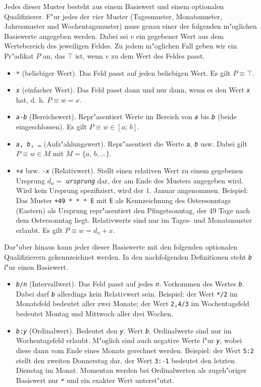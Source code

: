 \documentclass[a4paper]{article}
\numberwithin{equation}{section}
\begin{document}
Jedes dieser Muster besteht aus einem Basiswert und einem optionalen
Qualifizierer. F"ur jedes der vier Muster (Tagesmuster, Monatsmuster,
Jahresmuster und Wochentagsmuster) muss genau einer der folgenden m"oglichen
Basiswerte angegeben werden. Dabei sei $v$ ein gegebener Wert aus dem
Wertebereich des jeweiligen Feldes. Zu jedem m"oglichen Fall geben wir ein
Pr"adikat $P$ an, das $\top$ ist, wenn $v$ zu dem Wert des Feldes passt.
\begin{itemize}
\item \texttt{*} (beliebiger Wert). Das Feld passt auf jeden beliebigen Wert. Es
  gilt $P \equiv \top$.
\item \texttt{\textit{x}} (einfacher Wert). Das Feld passt dann und nur dann,
  wenn es den Wert \texttt{\textit{x}} hat, d. h. $P \equiv w = x$.
\item \texttt{\textit{a}-\textit{b}} (Bereichswert). Repr"asentiert Werte im
  Bereich von \texttt{\textit{a}} bis \texttt{\textit{b}} (beide
  eingeschlossen). Es gilt $P \equiv w \in [a;\,b]$.
\item \texttt{\textit{a}, \textit{b}, \ldots} (Aufz"ahlungswert). Repr"asentiert
  die Werte \texttt{\textit{a}}, \texttt{\textit{b}} usw. Dabei gilt
  $P \equiv w \in M$ mit $M = \{a,\,b,\dots\}$.
\item \texttt{+\textit{x}} bzw. \texttt{-\textit{x}} (Relativwert). Stellt einen
  relativen Wert zu einem gegebenen Ursprung $d_u = $ \texttt{\textit{ursprung}}
  dar, der am Ende des Musters angegeben wird. Wird kein Ursprung spezifiziert,
  wird der 1. Januar angenommen. Beispiel: Das Muster \texttt{+49 * * * E} mit
  \texttt{E} als Kennzeichnung des Ostersonntags (Eastern) als Ursprung
  repr"asentiert den Pfingstsonntag, der 49 Tage nach dem Ostersonntag liegt.
  Relativwerte sind nur im Tages- und Monatsmuster erlaubt. Es gilt
  $P \equiv w = d_u + x$.
\end{itemize}

\noindent Dar"uber hinaus kann jeder dieser Basiswerte mit den folgenden
optionalen Qualifizierern gekennzeichnet werden. In den nachfolgenden
Definitionen steht \texttt{\textit{b}} f"ur einen Basiswert.
\begin{itemize}
\item \texttt{\textit{b}/\textit{n}} (Intervallwert). Das Feld passt auf jedes
  \texttt{\textit{n}}. Vorkommen des Wertes \texttt{\textit{b}}. Dabei darf
  \texttt{\textit{b}} allerdings kein Relativwert sein. Beispiel: der Wert
  \texttt{*/2} im Monatsfeld bedeutet aller zwei Monate; der Wert \texttt{2,4/3}
  im Wochentagsfeld bedeutet Montag und Mittwoch aller drei Wochen.
\item \texttt{\textit{b}:\textit{y}} (Ordinalwert). Bedeutet den
  \texttt{\textit{y}}. Wert \texttt{\textit{b}}. Ordinalwerte sind nur im
  Wochentagsfeld erlaubt. M"oglich sind auch negative Werte f"ur
  \texttt{\textit{y}}, wobei diese dann vom Ende eines Monats gerechnet werden.
  Beispiel: der Wert \texttt{5:2} stellt den zweiten Donnerstag dar, der Wert
  \texttt{3:-1} bedeutet den letzten Dienstag im Monat. Momentan werden bei
  Ordinalwerten als zugeh"origer Basiswert nur \texttt{*} und ein exakter Wert
  unterst"utzt.
\end{itemize}
\end{document}
